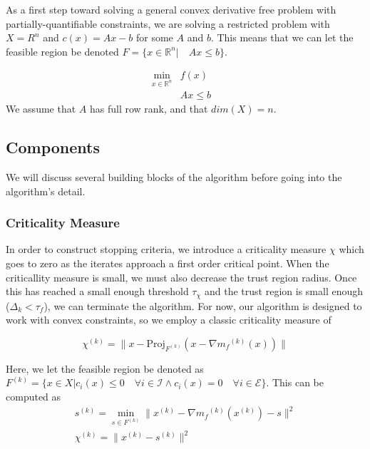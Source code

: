 \documentclass{article}
\theoremstyle{case}
\newcommand{\domain}{X}
\newcommand{\modelk}{{{m}_f}^{(k)}}
\newcommand{\iteratek}{{x}^{(k)}}
\newcommand{\trialk}{{s}^{(k)}}
\newcommand{\feasible}{{F}}
\newcommand{\feasiblek}{{F}^{(k)}}
\newcommand{\chik}{{\chi^{(k)}}}
\begin{document}
As a first step toward solving a general convex derivative free problem with partially-quantifiable constraints,
we are solving a restricted problem with $\domain = R^n$ and $c(x) = Ax-b$ for some $A$ and $b$.
This means that we can let the feasible region be denoted $\feasible = \{x \in \mathbb R^n | \quad  Ax \le b \}$.

\[ \begin{array}{ccl} \min_{x \in \mathbb R^n} & f(x) \\
& Ax \le b & 
\end{array}
\]
We assume that $A$ has full row rank, and that  $dim(\domain) = n$.




\subsection{Components}

We will discuss several building blocks of the algorithm before going into the algorithm's detail.


\subsubsection{Criticality Measure}

In order to construct stopping criteria, we introduce a criticality measure $\chi$ which goes to zero as the iterates approach a first order critical point.
When the criticallity measure is small, we must also decrease the trust region radius.
Once this has reached a small enough threshold $\tau_{\chi}$ and the trust region is small enough ($\Delta_k < \tau_f$), we can terminate the algorithm.
For now, our algorithm is designed to work with convex constraints, so we employ a classic criticality measure of

\[
\chik = \|x - \text{Proj}_{\feasiblek}(x - \nabla \modelk(x))\|
\]

Here, we let the feasible region be denoted as $\feasiblek = \{x \in X | c_i(x) \le 0 \quad \forall i \in \mathcal I \wedge c_i(x) = 0 \quad \forall i \in \mathcal E \}$.
This can be computed as 
\begin{align}
\label{critical}
\trialk = \min_{s \in \feasiblek} \|\iteratek - \nabla \modelk(\iteratek) - s\|^2 \\
\chik = \|\iteratek - \trialk \|^2 \\
\end{align}
\end{document}
